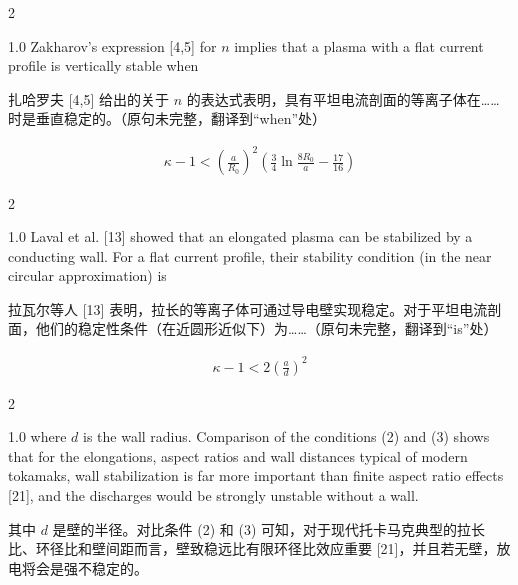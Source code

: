 \documentclass[utf8]{ctexart}
\newcommand\enzhbox[2]{
  	\quad\par \begin{paracol}{2} \colseprulecolor{black} 
  		\begin{spacing}{1.0}
  			\footnotesize  #1
  		\end{spacing}
  		\switchcolumn[1] 
  		#2
  	\end{paracol} \quad\par
  }
\begin{document}
\begin{sloppypar}
   
  
 
\enzhbox{  Zakharov's expression \textcolor{green!50!black}{[4,5]} for $n$ implies that a plasma with a flat current profile is vertically stable when}{
扎哈罗夫 \textcolor{green!50!black}{[4,5]} 给出的关于 $n$ 的表达式表明，具有平坦电流剖面的等离子体在……时是垂直稳定的。（原句未完整，翻译到“when”处） }
 \begin{align*}
 	 \kappa-1<\left(\frac{a}{R_{0}}\right)^{2}\left(\frac{3}{4} \ln \frac{8 R_{0}}{a}-\frac{17}{16}\right) \tag{2}
 \end{align*}
 
\enzhbox{  Laval et al. \textcolor{green!50!black}{[13]} showed that an elongated plasma can be stabilized by a conducting wall. For a flat current profile, their stability condition (in the near circular approximation) is}{
拉瓦尔等人 \textcolor{green!50!black}{[13]} 表明，拉长的等离子体可通过导电壁实现稳定。对于平坦电流剖面，他们的稳定性条件（在近圆形近似下）为……（原句未完整，翻译到“is”处） }
  
 \begin{align*}
 	 \kappa-1<2\left(\frac{a}{d}\right)^{2} \tag{3}
 \end{align*}
  
 
\enzhbox{  \noindent where $d$ is the wall radius. Comparison of the conditions (2) and (3) shows that for the elongations, aspect ratios and wall distances typical of modern tokamaks, wall stabilization is far more important than finite aspect ratio effects \textcolor{green!50!black}{[21]}, and the discharges would be strongly unstable without a wall.}{
\noindent 其中 $d$ 是壁的半径。对比条件 (2) 和 (3) 可知，对于现代托卡马克典型的拉长比、环径比和壁间距而言，壁致稳远比有限环径比效应重要 \textcolor{green!50!black}{[21]}，并且若无壁，放电将会是强不稳定的。 }
  
  
 

\end{sloppypar}
\end{document}
